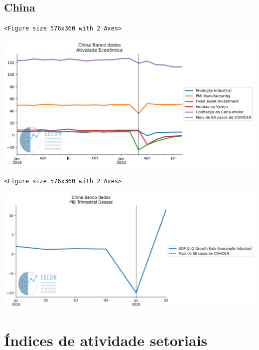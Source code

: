 \documentclass[11pt]{article}
\begin{document}
\subsection{China}
\label{sec:org547a6f1}

\begin{verbatim}
<Figure size 576x360 with 2 Axes>
\end{verbatim}


\begin{center}
\includegraphics[width=.9\linewidth]{obipy-resources/62e383af79e91b63c7fc98dd7fb55b3c3ececcb9/ce747718196bb9c2532973ff223629adeef0ec90.png}
\end{center}

\begin{verbatim}
<Figure size 576x360 with 2 Axes>
\end{verbatim}


\begin{center}
\includegraphics[width=.9\linewidth]{obipy-resources/62e383af79e91b63c7fc98dd7fb55b3c3ececcb9/b1fdb470863796d1f9a0279fd52036b836972e32.png}
\end{center}



\section{Índices de atividade setoriais}
\label{sec:org66b9afe}
\end{document}
